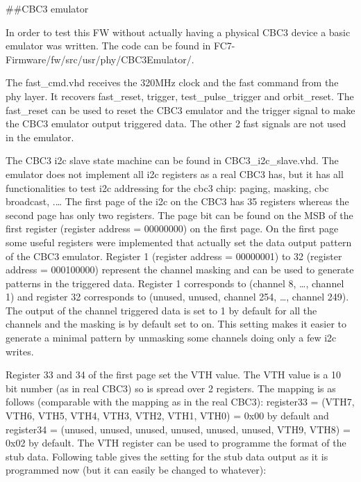 ##CBC3 emulator

In order to test this FW without actually having a physical CBC3 device a basic emulator was written. The code can be found in FC7-Firmware/fw/src/usr/phy/CBC3Emulator/.

The fast_cmd.vhd receives the 320MHz clock and the fast command from the phy layer. It recovers fast_reset, trigger, test_pulse_trigger and orbit_reset. The fast_reset can be used to reset the CBC3 emulator and the trigger signal to make the CBC3 emulator output triggered data. The other 2 fast signals are not used in the emulator.

The CBC3 i2c slave state machine can be found in CBC3_i2c_slave.vhd. The emulator does not implement all i2c registers as a real CBC3 has, but it has all functionalities to test i2c addressing for the cbc3 chip: paging, masking, cbc broadcast, .… The first page of the i2c on the CBC3 has 35 registers whereas the second page has only two registers. The page bit can be found on the MSB of the first register (register address = 00000000) on the first page. On the first page some useful registers were implemented that actually set the data output pattern of the CBC3 emulator. Register 1 (register address = 00000001) to 32 (register address = 000100000) represent the channel masking and can be used to generate patterns in the triggered data. Register 1 corresponds to (channel 8, …, channel 1) and register 32 corresponds to (unused, unused, channel 254, …, channel 249). The output of the channel triggered data is set to 1 by default for all the channels and the masking is by default set to on. This setting makes it easier to generate a minimal pattern by unmasking some channels doing only a few i2c writes.

Register 33 and 34 of the first page set the VTH value. The VTH value is a 10 bit number (as in real CBC3) so is spread over 2 registers. The mapping is as follows (comparable with the mapping as in the real CBC3): register33 = (VTH7, VTH6, VTH5, VTH4, VTH3, VTH2, VTH1, VTH0) = 0x00 by default and register34 = (unused, unused, unused, unused, unused, unused, VTH9, VTH8) = 0x02 by default. The VTH register can be used to programme the format of the stub data. Following table gives the setting for the stub data output as it is programmed now (but it can easily be changed to whatever):


